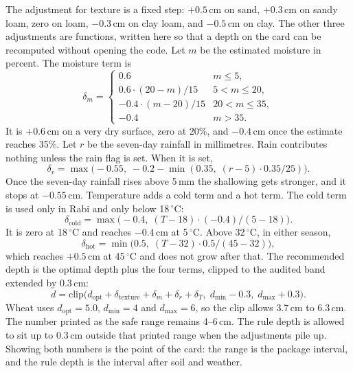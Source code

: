 The adjustment for texture is a fixed step: $+0.5$\,cm on sand, $+0.3$\,cm on sandy loam, zero on loam, $-0.3$\,cm on clay loam, and $-0.5$\,cm on clay. The other three adjustments are functions, written here so that a depth on the card can be recomputed without opening the code. Let $m$ be the estimated moisture in percent. The moisture term is
\begin{equation}
\delta_{m} =
\begin{cases}
0.6 & m \le 5, \\[2pt]
0.6 \cdot (20-m)/15 & 5 < m \le 20, \\[2pt]
-0.4 \cdot (m-20)/15 & 20 < m \le 35, \\[2pt]
-0.4 & m > 35.
\end{cases}
\label{eq:moisture}
\end{equation}
It is $+0.6$\,cm on a very dry surface, zero at 20\%, and $-0.4$\,cm once the estimate reaches 35\%. Let $r$ be the seven-day rainfall in millimetres. Rain contributes nothing unless the rain flag is set. When it is set,
\begin{equation}
\delta_{r} = \max\big(-0.55,\; -0.2 - \min(0.35,\; (r-5)\cdot 0.35/25)\big).
\label{eq:rain}
\end{equation}
Once the seven-day rainfall rises above 5\,mm the shallowing gets stronger, and it stops at $-0.55$\,cm. Temperature adds a cold term and a hot term. The cold term is used only in Rabi and only below 18\,$^{\circ}$C:
\begin{equation}
\delta_{\mathrm{cold}} = \max\big(-0.4,\; (T-18)\cdot(-0.4)/(5-18)\big).
\label{eq:cold}
\end{equation}
It is zero at 18\,$^{\circ}$C and reaches $-0.4$\,cm at 5\,$^{\circ}$C. Above 32\,$^{\circ}$C, in either season,
\begin{equation}
\delta_{\mathrm{hot}} = \min\big(0.5,\; (T-32)\cdot 0.5/(45-32)\big),
\label{eq:hot}
\end{equation}
which reaches $+0.5$\,cm at 45\,$^{\circ}$C and does not grow after that. The recommended depth is the optimal depth plus the four terms, clipped to the audited band extended by 0.3\,cm:
\begin{equation}
d = \mathrm{clip}\big(d_{\mathrm{opt}} + \delta_{\mathrm{texture}} + \delta_{m} + \delta_{r} + \delta_{T},\; d_{\min}-0.3,\; d_{\max}+0.3\big).
\label{eq:depth}
\end{equation}
Wheat uses $d_{\mathrm{opt}}=5.0$, $d_{\min}=4$ and $d_{\max}=6$, so the clip allows 3.7\,cm to 6.3\,cm. The number printed as the safe range remains 4--6\,cm. The rule depth is allowed to sit up to 0.3\,cm outside that printed range when the adjustments pile up. Showing both numbers is the point of the card: the range is the package interval, and the rule depth is the interval after soil and weather.

